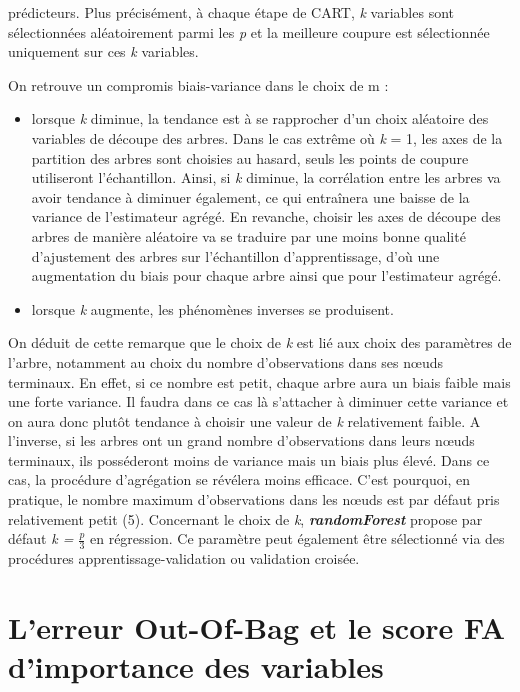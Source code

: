 		prédicteurs. Plus précisément, à chaque étape de CART, \textit{k} variables sont sélectionnées aléatoirement parmi les \textit{p} et la meilleure coupure est sélectionnée uniquement sur ces \textit{k} variables. \par
		On retrouve un compromis biais-variance dans le choix de m :
		\begin{itemize}
		\item lorsque \textit{k} diminue, la tendance est à se rapprocher d’un choix aléatoire des variables
		de découpe des arbres. Dans le cas extrême où \textit{k} = 1, les axes de la partition des arbres
		sont choisies au hasard, seuls les points de coupure utiliseront l’échantillon. Ainsi, si \textit{k}
		diminue, la corrélation entre les arbres va avoir tendance à diminuer également, ce qui
		entraînera une baisse de la variance de l’estimateur agrégé. En revanche, choisir les axes
		de découpe des arbres de manière aléatoire va se traduire par une moins bonne
		qualité d’ajustement des arbres sur l’échantillon d’apprentissage, d’où une augmentation
		du biais pour chaque arbre ainsi que pour l’estimateur agrégé.
		\item lorsque \textit{k} augmente, les phénomènes inverses se produisent.
		\end{itemize}
		On déduit de cette remarque que le choix de \textit{k} est lié aux choix des paramètres de l’arbre,
		notamment au choix du nombre d’observations dans ses nœuds terminaux. En effet, si ce
		nombre est petit, chaque arbre aura un biais faible mais une forte variance. Il faudra dans ce cas là s’attacher à diminuer cette variance et on aura donc plutôt tendance à choisir une
		valeur de \textit{k} relativement faible. A l’inverse, si les arbres ont un grand nombre d’observations
		dans leurs nœuds terminaux, ils posséderont moins de variance mais un biais plus élevé. Dans
		ce cas, la procédure d’agrégation se révélera moins efficace. C’est pourquoi, en pratique, le
		nombre maximum d’observations dans les nœuds est par défaut pris relativement petit (5). Concernant le choix de \textit{k}, \textit{\textbf{randomForest}} propose par
		défaut \textit{k = $\frac{p}{3}$} en régression. Ce paramètre peut également
		être sélectionné via des procédures apprentissage-validation ou validation croisée.
		
		
		\section{L'erreur Out-Of-Bag et le score FA d'importance des variables}
